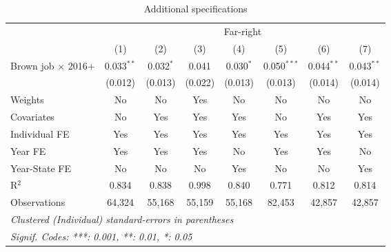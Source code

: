 \begin{table}[htbp]
   \caption{Additional specifications}
   \centering
   \begin{tabular}{lccccccc}
      \tabularnewline \midrule \midrule
       & \multicolumn{7}{c}{Far-right}\\
                                & (1)          & (2)         & (3)     & (4)         & (5)           & (6)          & (7)\\  
      Brown job $\times$ 2016+  & 0.033$^{**}$ & 0.032$^{*}$ & 0.041   & 0.030$^{*}$ & 0.050$^{***}$ & 0.044$^{**}$ & 0.043$^{**}$\\   
                                & (0.012)      & (0.013)     & (0.022) & (0.013)     & (0.013)       & (0.014)      & (0.014)\\   
      Weights                   & No           & No          & Yes     & No          & No            & No           & No\\  
      Covariates                & No           & Yes         & Yes     & Yes         & No            & Yes          & Yes\\  
      Individual FE             & Yes          & Yes         & Yes     & Yes         & Yes           & Yes          & Yes\\  
      Year FE                   & Yes          & Yes         & Yes     & No          & Yes           & Yes          & No\\  
      Year-State FE             & No           & No          & No      & Yes         & No            & No           & Yes\\  
      R$^2$                     & 0.834        & 0.838       & 0.998   & 0.840       & 0.771         & 0.812        & 0.814\\  
      Observations              & 64,324       & 55,168      & 55,159  & 55,168      & 82,453        & 42,857       & 42,857\\  
      \midrule \midrule
      \multicolumn{8}{l}{\emph{Clustered (Individual) standard-errors in parentheses}}\\
      \multicolumn{8}{l}{\emph{Signif. Codes: ***: 0.001, **: 0.01, *: 0.05}}\\
   \end{tabular}
\end{table}



